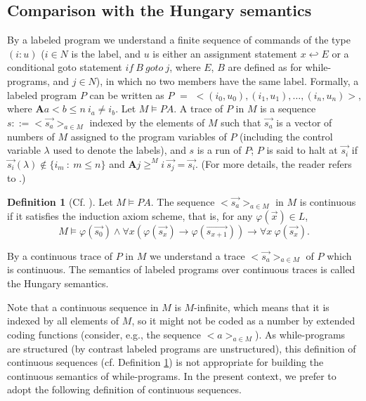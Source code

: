 \documentclass[a4paper,11pt]{article}
\begin{document}
\subsection{Comparison with the Hungary semantics}\label{comparison_with_the_Hungary_semantics}

By a labeled program we understand a finite sequence of commands of the type $(i:u)$ ($i\in N$ is the label, and $u$ is either an assignment statement $x\hookleftarrow E$ or a conditional goto statement $if\ B\ goto\ j$, where $E$, $B$ are defined as for while-programs, and $j\in N$), in which no two members have the same label. Formally, a labeled program $P$ can be written as $P$ $=$ $< (i_0, u_0), (i_1, u_1), \ldots, (i_n, u_n) >$, where $\textbf{A} a < b \leq n\ i_a \neq i_b$. Let $M\models PA$. A trace of $P$ in $M$ is a sequence $s ::= < \vec{s_a} >_{a\in M}$ indexed by the elements of $M$ such that $\vec{s_a}$ is a vector of numbers of $M$ assigned to the program variables of $P$ (including the control variable $\lambda$ used to denote the labels), and $s$ is a run of $P$; $P$ is said to halt at $\vec{s_i}$ if $\vec{s_i}(\lambda)\not\in \{i_m\ :\ m\leq n\}$ and $\textbf{A}j \geq^M i\ \vec{s_j} = \vec{s_i}$. (For more details, the reader refers to \cite{andreka_3}.)

\theoremstyle{definition}
\newtheorem{definition_of_continuous_sequences}{Definition}[subsection]
\begin{definition_of_continuous_sequences}[Cf. {\cite[pp165]{andreka_3}}]\label{definition_of_continuous_sequences}
  Let $M\models PA$. The sequence $< \vec{s_a} >_{a\in M}$ in $M$ is continuous if it satisfies the induction axiom scheme, that is, for any $\varphi(\vec{x})\in L$,
  \begin{equation*}
    M \models \varphi(\vec{s_0}) \wedge \forall x ( \varphi(\vec{s_x}) \rightarrow \varphi(\vec{s_{x+1}}) ) \rightarrow \forall x\ \varphi(\vec{s_x}).
  \end{equation*}
\end{definition_of_continuous_sequences}

By a continuous trace of $P$ in $M$ we understand a trace $< \vec{s_a} >_{a\in M}$ of $P$ which is continuous. The semantics of labeled programs over continuous traces is called the Hungary semantics.

Note that a continuous sequence in $M$ is $M$-infinite, which means that it is indexed by all elements of $M$, so it might not be coded as a number by extended coding functions (consider, e.g., the sequence $< a >_{a\in M}$). As while-programs are structured (by contrast labeled programs are unstructured), this definition of continuous sequences (cf. Definition \ref{definition_of_continuous_sequences}) is not appropriate for building the continuous semantics of while-programs. In the present context, we prefer to adopt the following definition of continuous sequences.
\end{document}
